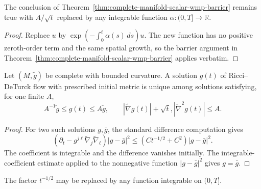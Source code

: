\begin{example}
\label{ex:wmp-integrable-time-coefficient}

The conclusion of Theorem~\ref{thm:complete-manifold-scalar-wmp-barrier}
remains true with $A/\sqrt t$ replaced by any integrable function
$\alpha:(0,T]\to\mathbb R$.
\end{example}

\begin{proof}
\sketch
{}
Replace $u$ by
$\exp(-\int_0^t\alpha(s)\,ds)u$.  The new function has no positive
zeroth-order term and the same spatial growth, so the barrier argument in
Theorem~\ref{thm:complete-manifold-scalar-wmp-barrier} applies verbatim.
\end{proof}

\begin{proposition}
\label{prop:ricci-deturck-uniqueness-controlled-class}

Let $(M,\widetilde g)$ be complete with bounded curvature.  A solution $g(t)$
of Ricci--DeTurck flow with prescribed initial metric is unique among solutions
satisfying, for one finite $A$,
\[
A^{-1}\widetilde g\leq g(t)\leq A\widetilde g,
\qquad
|\widetilde\nabla g(t)|+\sqrt t,|\widetilde\nabla^2g(t)|\leq A.
\]
\end{proposition}

\begin{proof}
\sketch
{}
For two such solutions $g,\bar g$, the standard difference computation gives
\[
(\partial_t-g^{j\ell}\widetilde\nabla_j\widetilde\nabla_\ell)
|g-\bar g|^2\leq(Ct^{-1/2}+C^2)|g-\bar g|^2.
\]
The coefficient is integrable and the difference vanishes initially.
The integrable-coefficient estimate applied to the nonnegative
function $|g-\bar g|^2$ gives $g=\bar g$.
\end{proof}

\begin{remark}
\label{rem:wmp-integrable-time-singularity}


The factor $t^{-1/2}$ may be replaced by any function integrable on $(0,T]$.
\end{remark}

